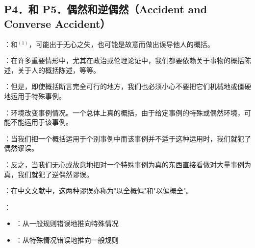 \subsection{P4．和 P5．偶然和逆偶然（Accident and Converse Accident）}

\begin{theorembox}[title=偶然和逆偶然谬误的定义与特征]
：和$^{(1)}$，可能出于无心之失，也可能是故意而做出误导他人的概括。

：在许多重要情形中，尤其在政治或伦理论证中，我们都要依赖关于事物的概括陈述，关于人的概括陈述，等等。

：但是，即使概括断言完全可行的地方，我们也必须小心不要把它们机械地或僵硬地运用于特殊事例。

：环境改变事例情况。一个总体上真的概括，由于给定事例的特殊或偶然环境，可能不能运用于该事例。

：当我们把一个概括运用于个别事例中而该事例并不适于这种运用时，我们就犯了偶然谬误。

：反之，当我们无心或故意地把对一个特殊事例为真的东西直接看做对大量事例为真，我们就犯了逆偶然谬误。

：在中文文献中，这两种谬误亦称为"以全概偏"和"以偏概全"。

：
\begin{itemize}
  \item {}：从一般规则错误地推向特殊情况
  \item {}：从特殊情况错误地推向一般规则
\end{itemize}
\end{theorembox}

